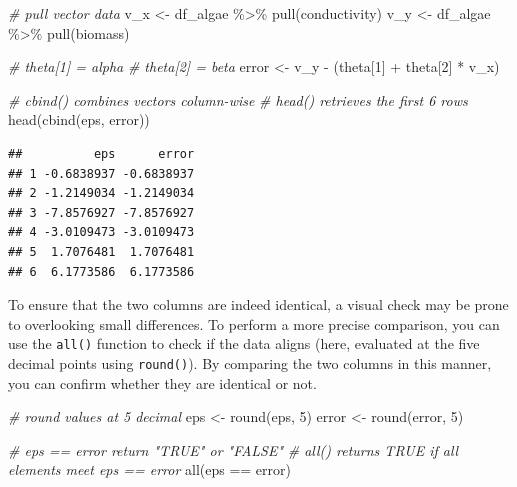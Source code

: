 \documentclass[
]{book}
\newenvironment{Shaded}{\begin{snugshade}}{\end{snugshade}}
\newcommand{\CommentTok}[1]{\textcolor[rgb]{0.56,0.35,0.01}{\textit{#1}}}
\newcommand{\DecValTok}[1]{\textcolor[rgb]{0.00,0.00,0.81}{#1}}
\newcommand{\FunctionTok}[1]{\textcolor[rgb]{0.00,0.00,0.00}{#1}}
\newcommand{\NormalTok}[1]{#1}
\newcommand{\OtherTok}[1]{\textcolor[rgb]{0.56,0.35,0.01}{#1}}
\newcommand{\SpecialCharTok}[1]{\textcolor[rgb]{0.00,0.00,0.00}{#1}}
\begin{document}
\begin{Shaded}
\begin{Highlighting}[]
\CommentTok{\# pull vector data}
\NormalTok{v\_x }\OtherTok{\textless{}{-}}\NormalTok{ df\_algae }\SpecialCharTok{\%\textgreater{}\%} \FunctionTok{pull}\NormalTok{(conductivity)}
\NormalTok{v\_y }\OtherTok{\textless{}{-}}\NormalTok{ df\_algae }\SpecialCharTok{\%\textgreater{}\%} \FunctionTok{pull}\NormalTok{(biomass)}

\CommentTok{\# theta[1] = alpha}
\CommentTok{\# theta[2] = beta}
\NormalTok{error }\OtherTok{\textless{}{-}}\NormalTok{ v\_y }\SpecialCharTok{{-}}\NormalTok{ (theta[}\DecValTok{1}\NormalTok{] }\SpecialCharTok{+}\NormalTok{ theta[}\DecValTok{2}\NormalTok{] }\SpecialCharTok{*}\NormalTok{ v\_x)}

\CommentTok{\# cbind() combines vectors column{-}wise}
\CommentTok{\# head() retrieves the first 6 rows}
\FunctionTok{head}\NormalTok{(}\FunctionTok{cbind}\NormalTok{(eps, error))}
\end{Highlighting}
\end{Shaded}

\begin{verbatim}
##          eps      error
## 1 -0.6838937 -0.6838937
## 2 -1.2149034 -1.2149034
## 3 -7.8576927 -7.8576927
## 4 -3.0109473 -3.0109473
## 5  1.7076481  1.7076481
## 6  6.1773586  6.1773586
\end{verbatim}

To ensure that the two columns are indeed identical, a visual check may be prone to overlooking small differences. To perform a more precise comparison, you can use the \texttt{all()} function to check if the data aligns (here, evaluated at the five decimal points using \texttt{round()}). By comparing the two columns in this manner, you can confirm whether they are identical or not.

\begin{Shaded}
\begin{Highlighting}[]
\CommentTok{\# round values at 5 decimal}
\NormalTok{eps }\OtherTok{\textless{}{-}} \FunctionTok{round}\NormalTok{(eps, }\DecValTok{5}\NormalTok{)}
\NormalTok{error }\OtherTok{\textless{}{-}} \FunctionTok{round}\NormalTok{(error, }\DecValTok{5}\NormalTok{)}

\CommentTok{\# eps == error return "TRUE" or "FALSE"}
\CommentTok{\# all() returns TRUE if all elements meet eps == error}
\FunctionTok{all}\NormalTok{(eps }\SpecialCharTok{==}\NormalTok{ error)}
\end{Highlighting}
\end{Shaded}
\end{document}
